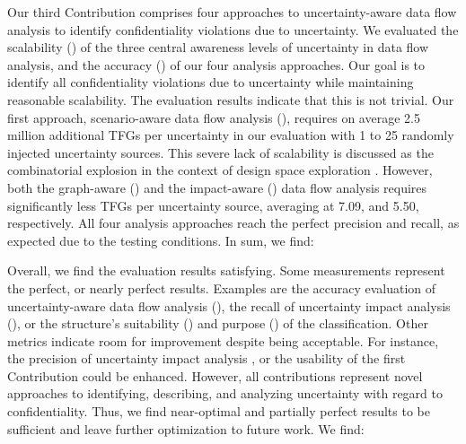 
Our third Contribution  comprises four approaches to uncertainty-aware data flow analysis to identify confidentiality violations due to uncertainty.
We evaluated the scalability () of the three central awareness levels of uncertainty in data flow analysis, and the accuracy () of our four analysis approaches.
Our goal is to identify all confidentiality violations due to uncertainty while maintaining reasonable scalability.
The evaluation results indicate that this is not trivial.
Our first approach, scenario-aware data flow analysis (), requires on average 2.5 million additional \acp{TFG} per uncertainty in our evaluation with 1 to 25 randomly injected uncertainty sources.
This severe lack of scalability is discussed as the combinatorial explosion in the context of design space exploration \cite{koziolek_automated_2011}.
However, both the graph-aware () and the impact-aware () data flow analysis requires significantly less \acp{TFG} per uncertainty source, averaging at 7.09, and 5.50, respectively.
All four analysis approaches reach the perfect precision and recall, as expected due to the testing conditions.
In sum, we find:


Overall, we find the evaluation results satisfying.
Some measurements represent the perfect, or nearly perfect results.
Examples are the accuracy evaluation of uncertainty-aware data flow analysis (), the recall of uncertainty impact analysis (), or the structure's suitability () and purpose () of the classification.
Other metrics indicate room for improvement despite being acceptable.
For instance, the precision of uncertainty impact analysis , or the usability of the first Contribution  could be enhanced.
However, all contributions represent novel approaches to identifying, describing, and analyzing uncertainty with regard to confidentiality.
Thus, we find near-optimal and partially perfect results to be sufficient and leave further optimization to future work. 
We find:

